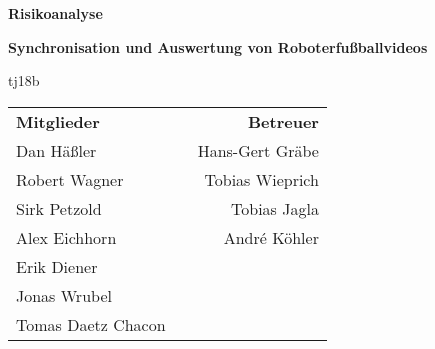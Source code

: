 \begin{titlepage}
\begin{center}
{\Huge\textbf{Risikoanalyse}\vspace{2em}}

{\Large\textbf{Synchronisation und Auswertung von Roboterfußballvideos}\vspace{1em}}

{\textsf{tj18b}\vspace{2em}}

\begin{table}[b]
\begin{tabularx}{\textwidth}{lXr}
\textbf{Mitglieder}&&\textbf{Betreuer}\\
Dan Häßler&&Hans-Gert Gräbe\\
Robert Wagner&&Tobias Wieprich\\
Sirk Petzold&&Tobias Jagla\\
Alex Eichhorn&&André Köhler\\
Erik Diener&&\\
Jonas Wrubel&&\\
Tomas Daetz Chacon&&\\
\end{tabularx}
\end{table}
\end{center}
\end{titlepage}